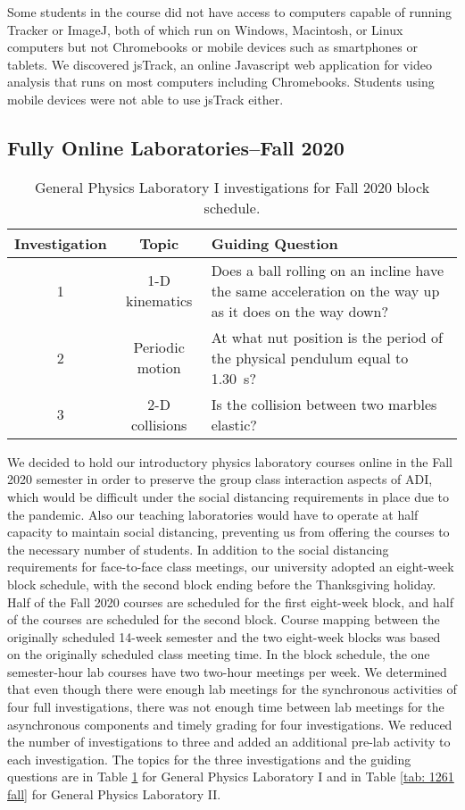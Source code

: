 \documentclass[aip, numerical, preprint]{revtex4-2}
\begin{document}
Some students in the course did not have access to computers capable of running Tracker or
ImageJ, both of which run on Windows, Macintosh, or Linux computers but not Chromebooks or
mobile devices such as smartphones or tablets. We discovered jsTrack\citep{jstrack}, an online
Javascript web application for video analysis that runs on most computers including
Chromebooks. Students using mobile devices were not able to use jsTrack either.

\subsection{Fully Online Laboratories--Fall 2020}

\begin{table}
  \caption{\label{tab: 1251 fall} General Physics Laboratory I investigations for Fall 2020
    block schedule.}
  \begin{ruledtabular}
    \begin{tabular}{ccp{28em}}
      Investigation & Topic & Guiding Question\\
      \hline
      1 & 1-D kinematics & Does a ball rolling on an incline have the same acceleration on the way up as it does on the way down? \\
      2 & Periodic motion & At what nut position is the period of the physical pendulum equal to \SI{1.30}{s}? \\
      3 & 2-D collisions & Is the collision between two marbles elastic?
    \end{tabular}
  \end{ruledtabular}
\end{table}

We decided to hold our introductory physics laboratory courses online in the Fall 2020 semester
in order to preserve the group class interaction aspects of ADI, which would be difficult under
the social distancing requirements in place due to the pandemic.\citep{mclber20} Also our
teaching laboratories would have to operate at half capacity to maintain social distancing,
preventing us from offering the courses to the necessary number of students.  In addition to
the social distancing requirements for face-to-face class meetings, our university adopted an
eight-week block schedule, with the second block ending before the Thanksgiving holiday. Half
of the Fall 2020 courses are scheduled for the first eight-week block, and half of the courses
are scheduled for the second block. Course mapping between the originally scheduled 14-week
semester and the two eight-week blocks was based on the originally scheduled class meeting
time. In the block schedule, the one semester-hour lab courses have two two-hour meetings per
week. We determined that even though there were enough lab meetings for the synchronous
activities of four full investigations, there was not enough time between lab meetings for the
asynchronous components and timely grading for four investigations. We reduced the number of
investigations to three and added an additional pre-lab activity to each investigation. The
topics for the three investigations and the guiding questions are in Table \ref{tab: 1251 fall}
for General Physics Laboratory I and in Table \ref{tab: 1261 fall} for General Physics
Laboratory II.
\end{document}
